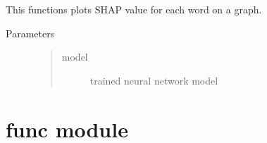 \documentclass[letterpaper,10pt,english]{sphinxmanual}
\begin{document}

\begin{fulllineitems}
\label{\detokenize{ff:ff.keras_shap}}
\pysigstartsignatures
{}
\pysigstopsignatures
\sphinxAtStartPar
This functions plots SHAP value for each word on a graph.
\begin{description}
\item[{Parameters}] \leavevmode\begin{quote}\begin{description}
\item[{model}] \leavevmode
\sphinxAtStartPar
trained neural network model

\end{description}\end{quote}

\end{description}

\end{fulllineitems}


\sphinxstepscope


\section{func module}
\label{\detokenize{func:module-func}}\label{\detokenize{func:func-module}}\label{\detokenize{func::doc}}
\end{document}
